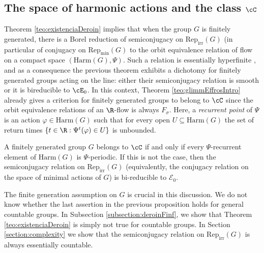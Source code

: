 \documentclass[reqno]{amsart}
\begin{document}
\subsection{The space of harmonic actions and the class $\cC$} \label{subsection:deroinborel}
Theorem \ref{teo:existenciaDeroin} implies that when the group $G$ is finitely generated, there is a Borel reduction of semiconjugacy on $\mathrm{Rep}_\mathrm{irr}(G)$ (in particular of conjugacy on $\mathrm{Rep}_\mathrm{min}(G)$ to the orbit equivalence relation of flow on a compact space $(\mathrm{Harm}(G), \Psi)$. Such a relation is essentially hyperfinite \cite{Wagh1988}, and as a consequence the previous theorem exhibits a dichotomy for finitely generated groups acting on the line: either their semiconjugacy relation is smooth or it is bireducible to $\cE_0$. In this context, Theorem \ref{teo:glimmEffrosIntro} already gives a criterion for finitely generated groups to belong to $\cC$ since the orbit equivalence relations of an $\R$-flow is always $F_\sigma$. Here, a \emph{recurrent point} of $\Psi$ is an action $\varphi \in \mathrm{Harm}(G)$ such that for every open $U \subseteq \mathrm{Harm}(G)$ the set of return times $\{t \in \R : \Psi^t(\varphi) \in U\}$ is unbounded.

\begin{prop} \label{prop:recurrenteIntro}
        A finitely generated group $G$ belongs to $\cC$ if and only if every $\Psi$-recurrent element of $\mathrm{Harm}(G)$ is $\Psi$-periodic. If this is not the case, then the semiconjugacy relation on $\mathrm{Rep}_\mathrm{irr}(G)$ (equivalently, the conjugacy relation on the space of minimal actions of $G$) is bi-reducible to $\mathcal{E}_0$.
\end{prop}
The finite generation assumption on $G$ is crucial in this discussion. We do not know whether the last assertion in the previous proposition holds for general countable groups. In Subsection \ref{subsection:deroinFinf}, we show that Theorem \ref{teo:existenciaDeroin} is simply not true for countable groups.
 In Section \ref{section:complexity} we show that the semiconjugacy relation on $\mathrm{Rep}_\mathrm{irr}(G)$ is always essentially countable.
\end{document}
